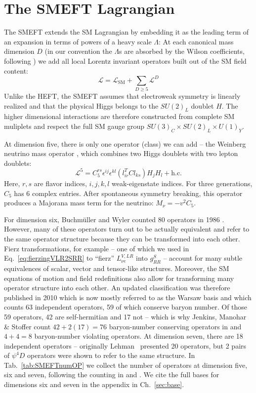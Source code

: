 \section{The SMEFT Lagrangian}
The SMEFT extends the SM Lagrangian by embedding it as the leading term of an expansion in terms of powers of a heavy scale $\Lambda$: At each canonical mass dimension $D$ (in our convention the $\Lambda$s are absorbed by the Wilson coefficients, following \cite{jenkins2013rge1}) we add all local Lorentz invariant operators built out of the SM field content:
\begin{equation}
    \mathcal{L}=\mathcal{L}_\text{SM}+\sum_{D\ge5}\mathcal{L}^D
\end{equation}
Unlike the HEFT, the SMEFT assumes that electroweak symmetry is linearly realized and that the physical Higgs belongs to the $SU(2)_L$ doublet $H$. The higher dimensional interactions are therefore constructed from complete SM muliplets and respect the full SM gauge group $SU(3)_C\times SU(2)_L\times U(1)_Y$.\par 
At dimension five, there is only one operator (class) we can add -- the Weinberg neutrino mass operator \cite{weinberg1967model}, which combines two Higgs doublets with two lepton doublets:
\begin{equation}
    \mathcal{L}^5=C_5^{rs}\epsilon ^{ij}\epsilon^{kl}(l^T_{ir}Cl_{ks})H_jH_l+\text{h.c.}
\end{equation}
Here, $r,s$ are flavor indices, $i,j,k,l$ weak-eigenstate indices. For three generations, $C_5$ has 6 complex entries. After spontaneous symmetry breaking, this operator produces a Majorana mass term for the neutrino: $M_\nu=-v^2C_5$.\par 
For dimension six, Buchmüller and Wyler counted 80 operators in 1986 \cite{buchmuller1986effective}. However, many of these operators turn out to be actually equivalent and refer to the same operator structure because they can be transformed into each other. Fierz transformations, for example -- one of which we used in Eq.~\ref{eq:fierzingVLR2SRR} to \enquote{fierz} $L_{\nu e}^{V,LR}$ into $g^S_{RR}$ -- account for many subtle equivalences of scalar, vector and tensor-like structures. Moreover, the SM equations of motion and field redefinitions also allow for transforming many operator structure into each other. An updated classification was therefore published in 2010 which is now mostly referred to as the Warsaw basis \cite{grzadkowski2010dimension} and which counts 63 independent operators, 59 of which conserve baryon number. Of those 59 operators, 42 are self-hermitian and 17 not -- which is why Jenkins, Manohar \& Stoffer count $42+2(17)=76$ baryon-number conserving operators in \cite{jenkins2018lowOM} and $4+4=8$ baryon-number violating operators. At dimension seven, there are 18 independent operators \cite{liao2020extending} -- originally Lehman~\cite{lehman2014extending} presented 20 operators, but 2 pairs of $\psi^4D$ operators were shown to refer to the same structure. In Tab.~\ref{tab:SMEFTnumOP} we collect the number of operators at dimension five, six and seven, following the counting in \cite{jenkins2018lowOM} and \cite{liao2020extending}. We cite the full bases for dimensions six and seven in the appendix in Ch.~\ref{sec:base}.
